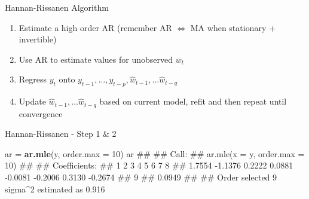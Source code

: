 \documentclass[11pt,ignorenonframetext,]{beamer}
\newenvironment{Shaded}{}{}
\newcommand{\DataTypeTok}[1]{\textcolor[rgb]{0.56,0.13,0.00}{#1}}
\newcommand{\DecValTok}[1]{\textcolor[rgb]{0.25,0.63,0.44}{#1}}
\newcommand{\KeywordTok}[1]{\textcolor[rgb]{0.00,0.44,0.13}{\textbf{#1}}}
\newcommand{\NormalTok}[1]{#1}
\newcommand{\StringTok}[1]{\textcolor[rgb]{0.25,0.44,0.63}{#1}}
\providecommand{\tightlist}{%
  \setlength{\itemsep}{0pt}\setlength{\parskip}{0pt}}
\let\oldShaded\Shaded
\let\endoldShaded\endShaded
\renewenvironment{Shaded}{\footnotesize\begin{spacing}{0.9}\oldShaded}{\endoldShaded\end{spacing}}
\let\oldverbatim\verbatim
\let\endoldverbatim\endverbatim
\newcommand{\scriptoutput}{
  \renewenvironment{Shaded}{\scriptsize\begin{spacing}{0.9}\oldShaded}{\endoldShaded\end{spacing}}
  \renewenvironment{verbatim}{\scriptsize\begin{spacing}{0.9}\oldverbatim}{\endoldverbatim\end{spacing}}
}
\begin{document}
\begin{frame}[t]{%
\protect\hypertarget{hannan-rissanen-algorithm}{%
Hannan-Rissanen Algorithm}}

\begin{enumerate}
[1.]
\tightlist
\item
  Estimate a high order AR (remember AR \(\Leftrightarrow\) MA when
  stationary + invertible)
\end{enumerate}

\vspace{5mm}

\begin{enumerate}
[1.]
\setcounter{enumi}{1}
\tightlist
\item
  Use AR to estimate values for unobserved \(w_t\)
\end{enumerate}

\vspace{5mm}

\begin{enumerate}
[1.]
\setcounter{enumi}{2}
\tightlist
\item
  Regress \(y_t\) onto
  \(y_{t-1}, \ldots, y_{t-p}, \hat{w}_{t-1}, \ldots \hat{w}_{t-q}\)
\end{enumerate}

\vspace{5mm}

\begin{enumerate}
[1.]
\setcounter{enumi}{3}
\tightlist
\item
  Update \(\hat{w}_{t-1}, \ldots \hat{w}_{t-q}\) based on current model,
  refit and then repeat until convergence
\end{enumerate}

\end{frame}

\begin{frame}[fragile,t]{%
\protect\hypertarget{hannan-rissanen---step-1-2}{%
Hannan-Rissanen - Step 1 \& 2}}

\scriptoutput

\begin{Shaded}
\begin{Highlighting}[]
\NormalTok{ar =}\StringTok{ }\KeywordTok{ar.mle}\NormalTok{(y, }\DataTypeTok{order.max =} \DecValTok{10}\NormalTok{)}
\NormalTok{ar}
\NormalTok{## }
\NormalTok{## Call:}
\NormalTok{## ar.mle(x = y, order.max = 10)}
\NormalTok{## }
\NormalTok{## Coefficients:}
\NormalTok{##       1        2        3        4        5        6        7        8  }
\NormalTok{##  1.7554  -1.1376   0.2222   0.0881  -0.0081  -0.2006   0.3130  -0.2674  }
\NormalTok{##       9  }
\NormalTok{##  0.0949  }
\NormalTok{## }
\NormalTok{## Order selected 9  sigma^2 estimated as  0.916}
\end{Highlighting}
\end{Shaded}

\end{frame}
\end{document}
